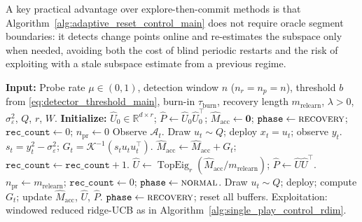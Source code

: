 \documentclass{article}
\newcommand{\R}{\mathbb{R}}
\newcommand{\cA}{\mathcal{A}}
\DeclareMathOperator{\TopEig}{TopEig}
\begin{document}
  A key practical advantage over explore-then-commit methods is that
  Algorithm~\ref{alg:adaptive_reset_control_main} does not require oracle
  segment boundaries: it detects change points online and re-estimates the
  subspace only when needed, avoiding both the cost of blind periodic restarts
  and the risk of exploiting with a stale subspace estimate from a previous regime.
\begin{algorithm}[t]
  \caption{Adaptive Single-Play Subspace-Calibrated Optimism (Unknown Segment Boundaries)}
  \label{alg:adaptive_reset_control_main}
  \begin{algorithmic}[1]
  \State \textbf{Input:} Probe rate $\mu\in(0,1)$, detection window $n$ ($n_r=n_p=n$),
         threshold $b$ from \eqref{eq:detector_threshold_main},
         burn-in $\tau_{\mathrm{burn}}$, recovery length $m_{\mathrm{relearn}}$,
         $\lambda>0$, $\sigma_\varepsilon^2$, $Q$, $r$, $W$.
  \State \textbf{Initialize:} $\widehat U_0\in\R^{d\times r}$;
         $\widehat P\leftarrow\widehat U_0\widehat U_0^\top$;
         $\widehat M_{\mathrm{acc}}\leftarrow\mathbf{0}$;
         $\mathtt{phase}\leftarrow\textsc{recovery}$;
         $\mathtt{rec\_count}\leftarrow 0$; $n_{\mathrm{pr}}\leftarrow 0$
      \State Observe $\cA_t$.
          \State Draw $u_t\sim Q$; deploy $x_t=u_t$; observe $y_t$.
          \State $s_t = y_t^2-\sigma_\varepsilon^2$; $G_t = \mathcal{K}^{-1}(s_t u_t u_t^\top)$.
          \State $\widehat M_{\mathrm{acc}}\leftarrow \widehat M_{\mathrm{acc}}+G_t$; $\mathtt{rec\_count}\leftarrow\mathtt{rec\_count}+1$.
              \State $\widehat U\leftarrow\TopEig_r(\widehat M_{\mathrm{acc}}/m_{\mathrm{relearn}})$;
                     $\widehat P\leftarrow\widehat U\widehat U^\top$.
              \State $n_{\mathrm{pr}}\leftarrow m_{\mathrm{relearn}}$;
                     $\mathtt{rec\_count}\leftarrow 0$;
                     $\mathtt{phase}\leftarrow\textsc{normal}$.
          \EndIf
      \Else
              \State Draw $u_t\sim Q$; deploy; compute $G_t$; update $\widehat M_{\mathrm{acc}}$, $\widehat U$, $\widehat P$.
                  \State $\mathtt{phase}\leftarrow\textsc{recovery}$; reset all buffers.
              \EndIf
          \Else
              \State Exploitation: windowed reduced ridge-UCB as in Algorithm~\ref{alg:single_play_control_rdim}.
          \EndIf
      \EndIf
  \EndFor
  \end{algorithmic}
\end{algorithm}
\end{document}
